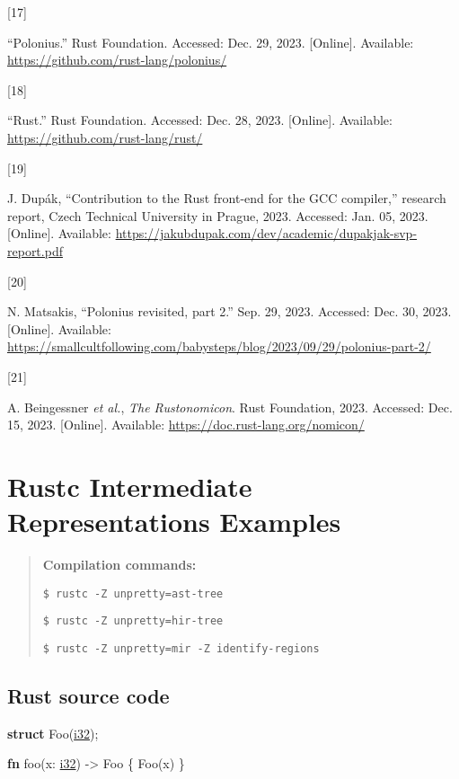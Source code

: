 \documentclass[
  11pt,
  twoside,symmetric]{report}
\newenvironment{Shaded}{}{}
\newcommand{\DataTypeTok}[1]{\underline{#1}}
\newcommand{\KeywordTok}[1]{\textbf{#1}}
\newcommand{\NormalTok}[1]{#1}
\newcommand{\OperatorTok}[1]{#1}
\newlength{\cslhangindent}
\newlength{\csllabelwidth}
\newenvironment{CSLReferences}[2] %
 {\begin{list}{}{%
  \setlength{\itemindent}{0pt}
  \setlength{\leftmargin}{0pt}
  \setlength{\parsep}{0pt}
  \ifodd #1
   \setlength{\leftmargin}{\cslhangindent}
   \setlength{\itemindent}{-1\cslhangindent}
  \fi
  \setlength{\itemsep}{#2\baselineskip}}}
 {\end{list}}
\newcommand{\CSLLeftMargin}[1]{\parbox[t]{\csllabelwidth}{\strut#1\strut}}
\newcommand{\CSLRightInline}[1]{\parbox[t]{\linewidth - \csllabelwidth}{\strut#1\strut}}
\begin{document}
\begin{CSLReferences}{0}{0}
\CSLLeftMargin{{[}17{]} }%
\CSLRightInline{{``Polonius.''} Rust Foundation. Accessed: Dec. 29,
2023. {[}Online{]}. Available:
\url{https://github.com/rust-lang/polonius/}}

\CSLLeftMargin{{[}18{]} }%
\CSLRightInline{{``Rust.''} Rust Foundation. Accessed: Dec. 28, 2023.
{[}Online{]}. Available: \url{https://github.com/rust-lang/rust/}}

\CSLLeftMargin{{[}19{]} }%
\CSLRightInline{J. Dupák, {``Contribution to the {R}ust front-end for
the {GCC} compiler,''} research report, Czech Technical University in
Prague, 2023. Accessed: Jan. 05, 2023. {[}Online{]}. Available:
\url{https://jakubdupak.com/dev/academic/dupakjak-svp-report.pdf}}

\CSLLeftMargin{{[}20{]} }%
\CSLRightInline{N. Matsakis, {``Polonius revisited, part 2.''} Sep. 29,
2023. Accessed: Dec. 30, 2023. {[}Online{]}. Available:
\url{https://smallcultfollowing.com/babysteps/blog/2023/09/29/polonius-part-2/}}

\CSLLeftMargin{{[}21{]} }%
\CSLRightInline{A. Beingessner \emph{et al.}, \emph{The {R}ustonomicon}.
Rust Foundation, 2023. Accessed: Dec. 15, 2023. {[}Online{]}. Available:
\url{https://doc.rust-lang.org/nomicon/}}

\end{CSLReferences}

\chapter{Rustc Intermediate Representations
Examples}\label{rustc-intermediate-representations-examples}

\begin{quote}
\textbf{Compilation commands:}

\texttt{\$\ rustc\ -Z\ unpretty=ast-tree}

\texttt{\$\ rustc\ -Z\ unpretty=hir-tree}

\texttt{\$\ rustc\ -Z\ unpretty=mir\ -Z\ identify-regions}
\end{quote}

\section{Rust source code}\label{rust-source-code}

\begin{Shaded}
\begin{Highlighting}[]
    \KeywordTok{struct}\NormalTok{ Foo(}\DataTypeTok{i32}\NormalTok{)}\OperatorTok{;}

    \KeywordTok{fn}\NormalTok{ foo(x}\OperatorTok{:} \DataTypeTok{i32}\NormalTok{) }\OperatorTok{{-}\textgreater{}}\NormalTok{ Foo }\OperatorTok{\{}
\NormalTok{        Foo(x)}
    \OperatorTok{\}}
\end{Highlighting}
\end{Shaded}
\end{document}
